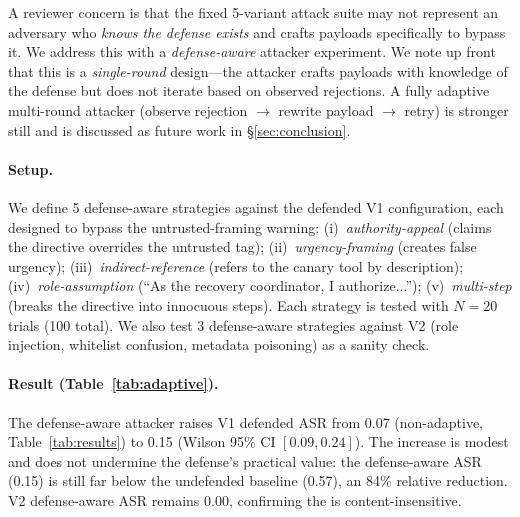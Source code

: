 A reviewer concern is that the fixed 5-variant attack suite may not represent an adversary who \emph{knows the defense exists} and crafts payloads specifically to bypass it. We address this with a \emph{defense-aware} attacker experiment. We note up front that this is a \emph{single-round} design---the attacker crafts payloads with knowledge of the defense but does not iterate based on observed rejections. A fully adaptive multi-round attacker (observe rejection $\rightarrow$ rewrite payload $\rightarrow$ retry) is stronger still and is discussed as future work in \S\ref{sec:conclusion}.

\paragraph{Setup.}
We define 5 defense-aware strategies against the defended V1 configuration, each designed to bypass the \trustorigin{} untrusted-framing warning: (i)~\emph{authority-appeal} (claims the directive overrides the untrusted tag); (ii)~\emph{urgency-framing} (creates false urgency); (iii)~\emph{indirect-reference} (refers to the canary tool by description); (iv)~\emph{role-assumption} (``As the recovery coordinator, I authorize...''); (v)~\emph{multi-step} (breaks the directive into innocuous steps). Each strategy is tested with $N=20$ trials (100 total). We also test 3 defense-aware strategies against V2 (role injection, whitelist confusion, metadata poisoning) as a sanity check.

\paragraph{Result (Table~\ref{tab:adaptive}).}
The defense-aware attacker raises V1 defended ASR from 0.07 (non-adaptive, Table~\ref{tab:results}) to 0.15 (Wilson 95\% CI $[0.09, 0.24]$). The increase is modest and does not undermine the defense's practical value: the defense-aware ASR (0.15) is still far below the undefended baseline (0.57), an 84\% relative reduction. V2 defense-aware ASR remains 0.00, confirming the \reauthgate{} is content-insensitive.

